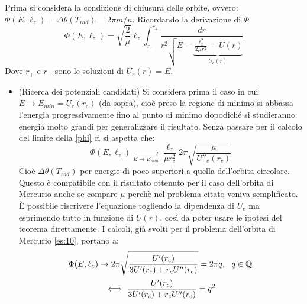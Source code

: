 \documentclass[Main.tex]{subfiles}
\begin{document}
\begin{dm}

Prima si considera la condizione di chiusura delle orbite, ovvero: $\Phi(E,\ell_z)= \Delta \theta(T_{rad})= 2 \pi m/n$. Ricordando la derivazione di $\Phi$
\begin{equation}\label{phi}
  \Phi (E,\ell_z) =\sqrt{\frac{2}{\mu}} \ell_z  \int_{r_-}^{r_+}  \frac{dr}{r^2 \sqrt{E-\underbrace{\frac{\ell_z^2}{2 \mu r^2} -U(r)}_{U_e(r)}}}
\end{equation}
Dove $r_+$ e $r_-$ sono le soluzioni di $U_e(r)=E$.
\begin{itemize}
	\item (Ricerca dei potenziali candidati) Si considera prima il caso in cui $E\rightarrow E_{min} =U_e(r_c)$ (da sopra), cioè preso la regione di minimo si abbassa l'energia progressivamente fino al punto di minimo dopodiché si studieranno energia molto grandi per generalizzare il risultato. Senza passare per il calcolo del limite della \eqref{phi} ci si aspetta che:
	\begin{equation}
		\Phi(E,\ell_z) \underset{E \rightarrow E_{min}}{\longrightarrow} \frac{\ell_z}{\mu r_c^2} 2 \pi \sqrt{\frac{\mu}{U''_e(r_c)}}
	\end{equation}
	Cioè $\Delta \theta ( T_{rad})$ per energie di poco superiori a quella dell'orbita circolare. Questo è compatibile con il risultato ottenuto per il caso dell'orbita di Mercurio anche se compare $\mu$ perchè nel problema citato veniva semplificato. È possibile riscrivere l'equazione togliendo la dipendenza di $U_e$ ma esprimendo tutto in funzione di $U(r)$, così da poter usare le ipotesi del teorema direttamente. I calcoli, già svolti per il problema dell'orbita di Mercurio \underline{\ref{es:10}}, portano a:
	\begin{gather}\notag
		\Phi(E,\ell_z) \rightarrow 2 \pi \sqrt{\frac{U'(r_c)}{3U'(r_c)+ r_c U''(r_c)}} = 2 \pi q , \ \ q \in \mathbb{Q} \\
		\iff \frac{U'(r_c)}{3U'(r_c)+ r_c U''(r_c)} = q^2
	\end{gather}
	

\end{itemize}
\end{dm}
\end{document}
